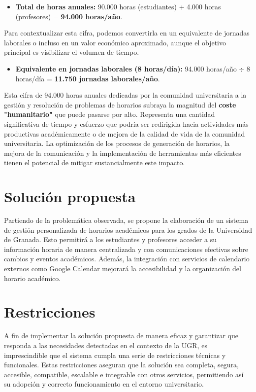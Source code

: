 \begin{itemize}
    \item \textbf{Total de horas anuales:} 90.000 horas (estudiantes) + 4.000 horas (profesores) = \textbf{94.000 horas/año}.
\end{itemize}

Para contextualizar esta cifra, podemos convertirla en un equivalente de jornadas laborales o incluso en un valor económico aproximado, aunque el objetivo principal es visibilizar el volumen de tiempo.

\begin{itemize}
    \item \textbf{Equivalente en jornadas laborales (8 horas/día):} 94.000 horas/año $\div$ 8 horas/día = \textbf{11.750 jornadas laborales/año}.
\end{itemize}

Esta cifra de 94.000 horas anuales dedicadas por la comunidad universitaria a la gestión y resolución de problemas de horarios subraya la magnitud del \textbf{coste "humanitario"} que puede pasarse por alto. Representa una cantidad significativa de tiempo y esfuerzo que podría ser redirigida hacia actividades más productivas académicamente o de mejora de la calidad de vida de la comunidad universitaria. La optimización de los procesos de generación de horarios, la mejora de la comunicación y la implementación de herramientas más eficientes tienen el potencial de mitigar sustancialmente este impacto.

\section{Solución propuesta}

Partiendo de la problemática observada, se propone la elaboración de un sistema de gestión personalizada de horarios académicos para los grados de la Universidad de Granada. 
Esto permitirá a los estudiantes y profesores acceder a su información horaria de manera centralizada y con comunicaciones efectivas sobre cambios y eventos académicos. Además, la integración con servicios de calendario externos como Google Calendar mejorará la accesibilidad y la organización del horario académico.

\section{Restricciones}

A fin de implementar la solución propuesta de manera eficaz y garantizar que responda a las necesidades detectadas en el contexto de la UGR, es imprescindible que el sistema cumpla una serie de restricciones técnicas y funcionales. Estas restricciones aseguran que la solución sea completa, segura, accesible, compatible, escalable e integrable con otros servicios, permitiendo así su adopción y correcto funcionamiento en el entorno universitario.

